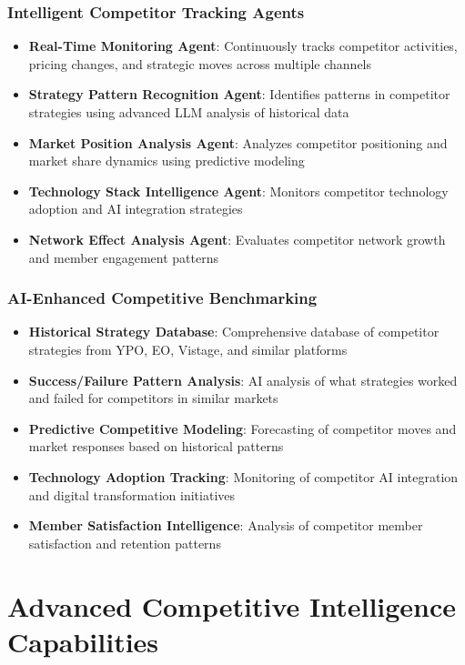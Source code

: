 \documentclass[12pt,a4paper]{book}
\begin{document}
\subsubsection{Intelligent Competitor Tracking Agents}

\begin{itemize}
    \item \textbf{Real-Time Monitoring Agent}: Continuously tracks competitor activities, pricing changes, and strategic moves across multiple channels
    \item \textbf{Strategy Pattern Recognition Agent}: Identifies patterns in competitor strategies using advanced LLM analysis of historical data
    \item \textbf{Market Position Analysis Agent}: Analyzes competitor positioning and market share dynamics using predictive modeling
    \item \textbf{Technology Stack Intelligence Agent}: Monitors competitor technology adoption and AI integration strategies
    \item \textbf{Network Effect Analysis Agent}: Evaluates competitor network growth and member engagement patterns
\end{itemize}

\subsubsection{AI-Enhanced Competitive Benchmarking}

\begin{itemize}
    \item \textbf{Historical Strategy Database}: Comprehensive database of competitor strategies from YPO, EO, Vistage, and similar platforms
    \item \textbf{Success/Failure Pattern Analysis}: AI analysis of what strategies worked and failed for competitors in similar markets
    \item \textbf{Predictive Competitive Modeling}: Forecasting of competitor moves and market responses based on historical patterns
    \item \textbf{Technology Adoption Tracking}: Monitoring of competitor AI integration and digital transformation initiatives
    \item \textbf{Member Satisfaction Intelligence}: Analysis of competitor member satisfaction and retention patterns
\end{itemize}

\section{Advanced Competitive Intelligence Capabilities}
\end{document}
